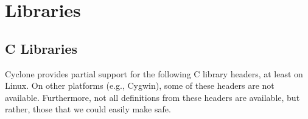 \section{Libraries}
\label{sec:libraries}

\ifscreen
{}
\else
{}
\fi

\subsection{C Libraries}
Cyclone provides partial support for the following C library headers,
at least on Linux.  On other platforms (e.g., Cygwin), some of these
headers are not available.  Furthermore, not all definitions from
these headers are available, but rather, those that we could easily
make safe.

